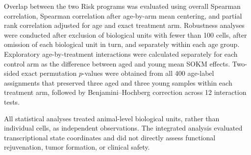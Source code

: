 Overlap between the two Risk programs was evaluated using overall Spearman
correlation, Spearman correlation after age-by-arm mean centering, and partial
rank correlation adjusted for age and exact treatment arm. Robustness analyses
were conducted after exclusion of biological units with fewer than 100 cells,
after omission of each biological unit in turn, and separately within each age
group. Exploratory age-by-treatment interactions were calculated separately
for each control arm as the difference between aged and young mean SOKM
effects. Two-sided exact permutation $p$-values were obtained from all 400
age-label assignments that preserved three aged and three young samples within
each treatment arm, followed by Benjamini--Hochberg correction across 12
interaction tests.

All statistical analyses treated animal-level biological units, rather than
individual cells, as independent observations. The integrated analysis
evaluated transcriptional state coordinates and did not directly assess
functional rejuvenation, tumor formation, or clinical safety.
